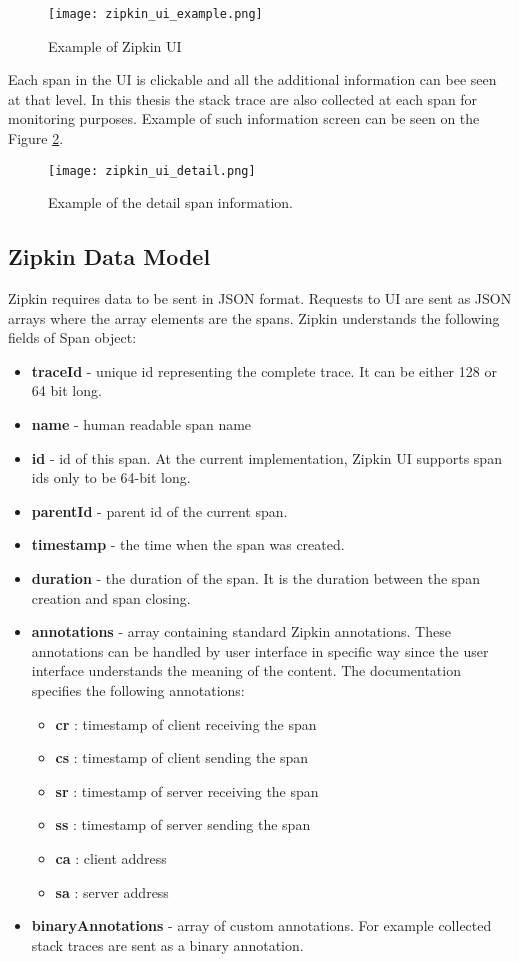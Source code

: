 \begin{figure}
	\centering
	\texttt{[image: zipkin\_ui\_example.png]}
	\caption{Example of Zipkin UI}
	\label{fig:zipkin_ui}
\end{figure}

Each span in the UI is clickable and all the additional information can bee seen at that level. In this thesis the stack trace are also collected at each span for monitoring purposes. Example of such information screen can be seen on the Figure \ref{fig:zipkin_ui_detail}.
\begin{figure}
	\centering
	\texttt{[image: zipkin\_ui\_detail.png]}
	\caption{Example of the detail span information.}
	\label{fig:zipkin_ui_detail}
\end{figure}
\subsection{Zipkin Data Model}
Zipkin requires data to be sent in JSON format. Requests to UI are sent as JSON arrays where the array elements are the spans. Zipkin understands the following fields of Span object:
\begin{itemize}
	\item \textbf{traceId} - unique id representing the complete trace. It can be either 128 or 64 bit long.
	\item \textbf{name} - human readable span name
	\item \textbf{id} - id of this span. At the current implementation, Zipkin UI supports span ids only to be 64-bit long.
	\item \textbf{parentId} - parent id of the current span.
	\item \textbf{timestamp} - the time when the span was created.
	\item \textbf{duration} - the duration of the span. It is the duration between the span creation and span closing.
	\item \textbf{annotations} - array containing standard Zipkin annotations. These annotations can be handled by user interface in specific way since the user interface understands the meaning of the content. The documentation specifies the following annotations:
	\begin{itemize}
		\item \textbf{cr} : timestamp of client receiving the span
		\item \textbf{cs} : timestamp of client sending the span
		\item \textbf{sr} : timestamp of server receiving the span
		\item \textbf{ss} : timestamp of server sending the span
		\item \textbf{ca} : client address
		\item \textbf{sa} : server address
	\end{itemize}
	\item \textbf{binaryAnnotations} - array of custom annotations. For example collected stack traces are sent as a binary annotation.
\end{itemize}

